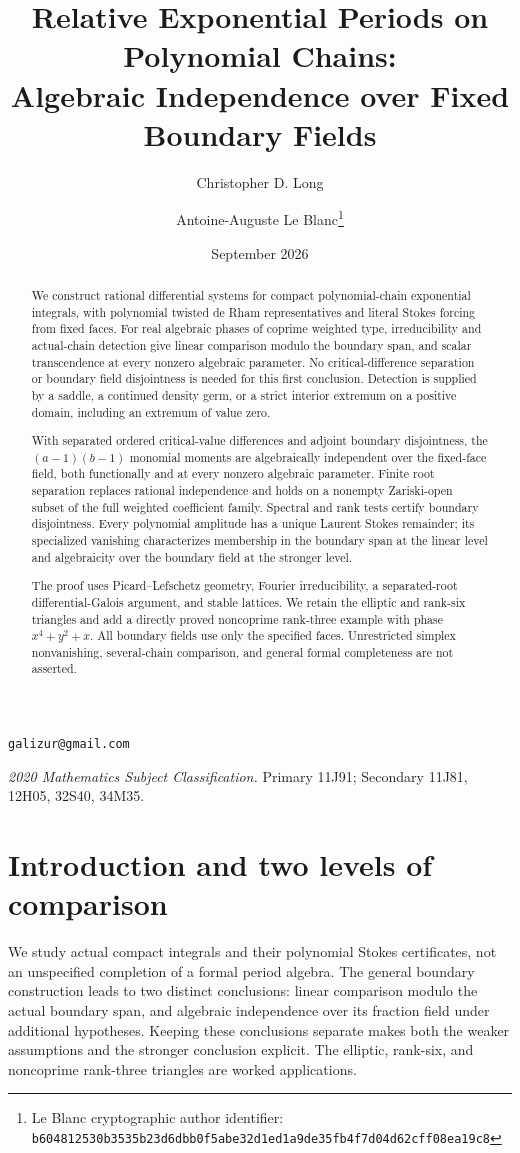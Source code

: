 \documentclass[11pt]{article}
\title{Relative Exponential Periods on Polynomial Chains:\\
Algebraic Independence over Fixed Boundary Fields}
\author{Christopher D. Long \and Antoine-Auguste Le Blanc\thanks{Le Blanc cryptographic author identifier: \texttt{b6048125\allowbreak{}30b3535b\allowbreak{}23d6dbb0\allowbreak{}f5abe32d\allowbreak{}1ed1a9de\allowbreak{}35fb4f7d\allowbreak{}04d62cff\allowbreak{}08ea19c8}}}
\date{September 2026}
\numberwithin{equation}{section}
\theoremstyle{definition}
\theoremstyle{remark}
\begin{document}
\maketitle

\begin{center}
\small
\texttt{galizur@gmail.com}
\end{center}

\begin{abstract}
We construct rational differential systems for compact polynomial-chain
exponential integrals, with polynomial twisted de Rham representatives and
literal Stokes forcing from fixed faces. For real algebraic phases of coprime
weighted type, irreducibility and actual-chain detection give linear
comparison modulo the boundary span, and scalar transcendence at every
nonzero algebraic parameter. No critical-difference separation or boundary
field disjointness is needed for this first conclusion. Detection is supplied
by a saddle, a continued density germ, or a strict interior extremum on a
positive domain, including an extremum of value zero.

With separated ordered critical-value differences and adjoint boundary
disjointness, the $(a-1)(b-1)$ monomial moments are algebraically independent
over the fixed-face field, both functionally and at every nonzero algebraic
parameter. Finite root separation replaces rational independence and holds
on a nonempty Zariski-open subset of the full weighted coefficient family.
Spectral and rank tests certify boundary disjointness. Every polynomial
amplitude has a unique Laurent Stokes remainder; its specialized vanishing
characterizes membership in the boundary span at the linear level and
algebraicity over the boundary field at the stronger level.

The proof uses Picard--Lefschetz geometry, Fourier irreducibility, a
separated-root differential-Galois argument, and stable lattices. We retain
the elliptic and rank-six triangles and add a directly proved noncoprime
rank-three example with phase $x^4+y^2+x$. All boundary fields use only the
specified faces. Unrestricted simplex nonvanishing, several-chain comparison,
and general formal completeness are not asserted.
\end{abstract}

\medskip
\noindent\textit{2020 Mathematics Subject Classification.}
Primary 11J91; Secondary 11J81, 12H05, 32S40, 34M35.
\tableofcontents

\section{Introduction and two levels of comparison}\label{sec:intro}
We study actual compact integrals and their polynomial Stokes certificates,
not an unspecified completion of a formal period algebra. The general
boundary construction leads to two distinct conclusions: linear comparison
modulo the actual boundary span, and algebraic independence over its fraction
field under additional hypotheses. Keeping these conclusions separate makes
both the weaker assumptions and the stronger conclusion explicit. The
elliptic, rank-six, and noncoprime rank-three triangles are worked applications.
\end{document}

